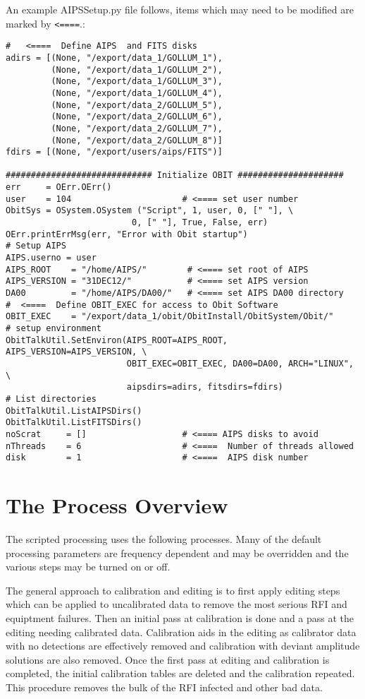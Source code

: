 \documentclass[11pt]{article}
\begin{document}
An example AIPSSetup.py file follows, items which may need to be
modified are marked by {\tt <====}.:
\begin{verbatim}
#   <====  Define AIPS  and FITS disks
adirs = [(None, "/export/data_1/GOLLUM_1"),
         (None, "/export/data_1/GOLLUM_2"),
         (None, "/export/data_1/GOLLUM_3"),
         (None, "/export/data_1/GOLLUM_4"),
         (None, "/export/data_2/GOLLUM_5"),
         (None, "/export/data_2/GOLLUM_6"),
         (None, "/export/data_2/GOLLUM_7"),
         (None, "/export/data_2/GOLLUM_8")]
fdirs = [(None, "/export/users/aips/FITS")]

############################# Initialize OBIT #####################
err     = OErr.OErr()
user    = 104                      # <==== set user number
ObitSys = OSystem.OSystem ("Script", 1, user, 0, [" "], \
                         0, [" "], True, False, err)
OErr.printErrMsg(err, "Error with Obit startup")
# Setup AIPS
AIPS.userno = user
AIPS_ROOT    = "/home/AIPS/"        # <==== set root of AIPS
AIPS_VERSION = "31DEC12/"           # <==== set AIPS version
DA00         = "/home/AIPS/DA00/"   # <==== set AIPS DA00 directory
#  <====  Define OBIT_EXEC for access to Obit Software 
OBIT_EXEC    = "/export/data_1/obit/ObitInstall/ObitSystem/Obit/"
# setup environment
ObitTalkUtil.SetEnviron(AIPS_ROOT=AIPS_ROOT, AIPS_VERSION=AIPS_VERSION, \
                        OBIT_EXEC=OBIT_EXEC, DA00=DA00, ARCH="LINUX", \
                        aipsdirs=adirs, fitsdirs=fdirs)
# List directories
ObitTalkUtil.ListAIPSDirs()
ObitTalkUtil.ListFITSDirs()
noScrat     = []                   # <==== AIPS disks to avoid 
nThreads    = 6                    # <====  Number of threads allowed
disk        = 1                    # <====  AIPS disk number
\end{verbatim}

\section{The Process Overview}

The scripted processing uses the following processes.
Many of the default processing parameters are frequency dependent and
may be overridden and the various steps may be turned on or off.

The general approach to calibration and editing is to first apply
editing steps which can be applied to uncalibrated data to remove the
most serious RFI and equiptment failures.
Then an initial pass at calibration is done and a pass at the editing
needing calibrated data.
Calibration aids in the editing as calibrator data with no detections
are effectively removed and calibration with deviant amplitude
solutions are also removed.
Once the first pass at editing and calibration is completed, the
initial calibration tables are deleted and the calibration repeated.
This procedure removes the bulk of the RFI infected and other bad
data.
\end{document}
